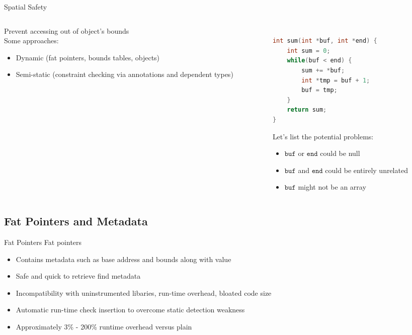 \documentclass[aspectratio=169]{beamer}
\begin{document}
\begin{frame}[fragile]{Spatial Safety}
  \footnotesize
  \begin{columns}[T]
    \begin{column}{0.45\textwidth}
        Prevent accessing out of object's bounds
        \\
        Some approaches:
        \begin{itemize}
            \item Dynamic \footnotesize{(fat pointers, bounds tables, objects)}
            \item Semi-static \footnotesize{(constraint checking via annotations and dependent types})
        \end{itemize}
    \end{column}
    \begin{column}{0.45\textwidth}
\begin{lstlisting}[language=C,mathescape] %,basicstyle={\footnotesize\ttfamily}]

int sum(int *buf, int *end) {
    int sum = 0;
    while(buf < end) {
        sum += *buf;
        int *tmp = buf + 1;
        buf = tmp;
    }
    return sum;
}
\end{lstlisting}
Let's list the potential problems:
        \begin{itemize}
            \item $\texttt{buf}$ or $\texttt{end}$ could be null
            \item $\texttt{buf}$ and $\texttt{end}$ could be entirely unrelated
            \item $\texttt{buf}$ might not be an array %
        \end{itemize}
    \end{column}
  \end{columns}
\end{frame}

\subsection{Fat Pointers and Metadata}

\begin{frame}[fragile]{Fat Pointers}
  \footnotesize
Fat pointers
\begin{itemize}
 \item Contains metadata such as base address and bounds along with value
 \item Safe and quick to retrieve find metadata
 \item Incompatibility with uninstrumented libaries, run-time overhead, bloated code size
 \item Automatic run-time check insertion to overcome static detection weakness
 \item Approximately 3\% - 200\% runtime overhead versus plain
\end{itemize}
\end{frame}
\end{document}
